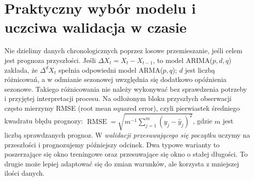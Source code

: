 \documentclass[11pt,a4paper,oneside]{report}
\numberwithin{equation}{chapter}
\theoremstyle{plain}
\theoremstyle{definition}
\theoremstyle{remark}
\begin{document}
\section{Praktyczny wybór modelu i uczciwa walidacja w czasie}
Nie dzielimy danych chronologicznych poprzez losowe
przemieszanie, jeśli celem jest prognoza przyszłości.
Jeśli $\Delta X_t=X_t-X_{t-1}$, to model
ARIMA($p,d,q$) zakłada, że $\Delta^d X_t$ spełnia
odpowiedni model ARMA($p,q$); $d$ jest liczbą
różnicowań, a w odmianie sezonowej uwzględnia się
dodatkowo opóźnienia sezonowe. Takiego różnicowania
nie należy wykonywać bez sprawdzenia potrzeby i
przyjętej interpretacji procesu.
Na odłożonym bloku przyszłych obserwacji często mierzymy
RMSE (root mean squared error), czyli pierwiastek
średniego kwadratu błędu prognozy:
$\operatorname{RMSE}=\sqrt{m^{-1}\sum_{j=1}^m(y_j-\widehat y_j)^2}$,
gdzie $m$ jest liczbą sprawdzanych prognoz.
W \emph{walidacji przesuwającego się początku} uczymy
na przeszłości i prognozujemy późniejszy odcinek.
Dwa typowe warianty to poszerzające się okno treningowe
oraz przesuwające się okno o stałej długości.
To drugie może lepiej adaptować się do zmian
warunków, ale korzysta z mniejszej ilości danych.

\begin{center}
\end{center}
\end{document}
